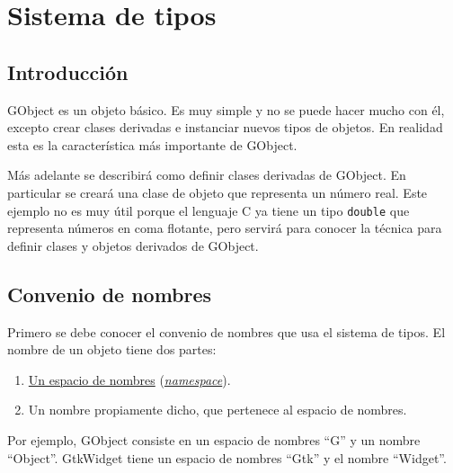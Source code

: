%

\section{Sistema de tipos}
\subsection{Introducción}
\textsf{GObject} es un objeto básico. Es muy simple y no se puede hacer mucho con él, excepto crear
clases derivadas e instanciar nuevos tipos de objetos.
En realidad esta es la característica más importante de \textsf{GObject}.

Más adelante se describirá como definir clases derivadas de \textsf{GObject}.
En particular se creará una clase de objeto  que representa un número real.
Este ejemplo no es muy útil porque el lenguaje C ya tiene un tipo \texttt{double} que representa
números en coma flotante, pero servirá para conocer la técnica para definir clases y objetos derivados de \textsf{GObject}.

\subsection{Convenio de nombres}
Primero se debe conocer el convenio de nombres que usa el sistema de tipos.
El nombre de un objeto tiene dos partes:
\begin{enumerate}
  \tightlist
\item \href{https://es.wikipedia.org/wiki/Espacio_de_nombres}{\textsf{Un espacio de nombres}}
  (\href{https://en.wikipedia.org/wiki/Namespace}{\emph\textsf{{namespace}}}).
\item Un nombre propiamente dicho, que pertenece al espacio de nombres.
\end{enumerate}

Por ejemplo, \textsf{GObject} consiste en un espacio de nombres ``\textsf{G}'' y un nombre ``\textsf{Object}''.
\textsf{GtkWidget} tiene un espacio de nombres ``\textsf{Gtk}'' y el nombre ``\textsf{Widget}''.

